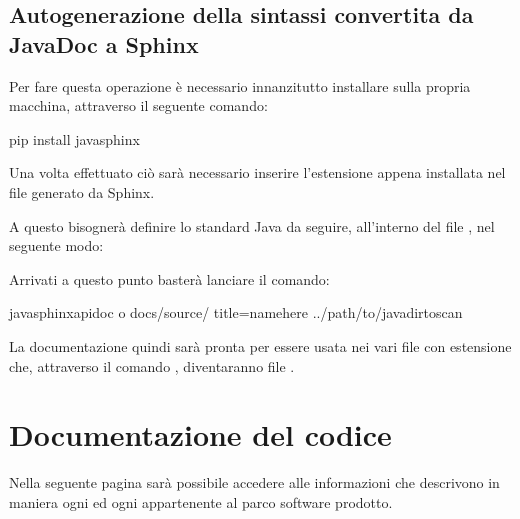\documentclass[letterpaper,10pt,italian,openany,oneside]{sphinxmanual}
\begin{document}
\section{Autogenerazione della sintassi convertita da JavaDoc a Sphinx}
\label{\detokenize{sphinx:autogenerazione-della-sintassi-convertita-da-javadoc-a-sphinx}}
Per fare questa operazione è necessario innanzitutto installare 
sulla propria macchina, attraverso il seguente comando:

\begin{sphinxVerbatim}[commandchars=\\\{\}]
\PYGZdl{} pip install javasphinx
\end{sphinxVerbatim}

Una volta effettuato ciò sarà necessario inserire l’estensione  appena installata
nel file  generato da Sphinx.

A questo bisognerà definire lo standard Java da seguire, all’interno del file
, nel seguente modo:


Arrivati a questo punto basterà lanciare il comando:

\begin{sphinxVerbatim}[commandchars=\\\{\}]
\PYGZdl{} javasphinx\PYGZhy{}apidoc \PYGZhy{}o docs/source/ \PYGZhy{}\PYGZhy{}title=\PYGZsq{}\PYGZlt{}name\PYGZus{}here\PYGZgt{}\PYGZsq{} ../path/to/java\PYGZus{}dirtoscan
\end{sphinxVerbatim}

La documentazione quindi sarà pronta per essere usata nei vari file con estensione  che, attraverso il comando , diventaranno file .


\chapter{Documentazione del codice}
\label{\detokenize{source/packages:documentazione-del-codice}}\label{\detokenize{source/packages::doc}}
Nella seguente pagina sarà possibile accedere alle informazioni che descrivono in maniera  ogni
 ed ogni  appartenente al parco software prodotto.
\end{document}
